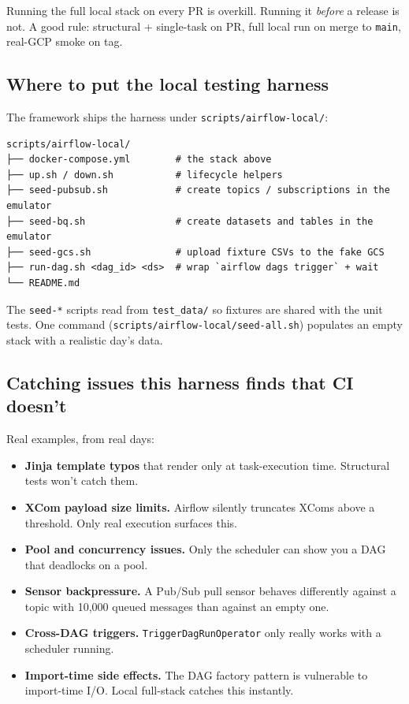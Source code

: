 \documentclass[
  11pt,
  british,
  oneside]{book}
\providecommand{\tightlist}{%
  \setlength{\itemsep}{0pt}\setlength{\parskip}{0pt}}
\begin{document}
Running the full local stack on every PR is overkill. Running it
\emph{before} a release is not. A good rule: structural + single-task on
PR, full local run on merge to \texttt{main}, real-GCP smoke on tag.

\hypertarget{where-to-put-the-local-testing-harness}{%
\subsection{Where to put the local testing
harness}\label{where-to-put-the-local-testing-harness}}

The framework ships the harness under \texttt{scripts/airflow-local/}:

\begin{verbatim}
scripts/airflow-local/
├── docker-compose.yml        # the stack above
├── up.sh / down.sh           # lifecycle helpers
├── seed-pubsub.sh            # create topics / subscriptions in the emulator
├── seed-bq.sh                # create datasets and tables in the emulator
├── seed-gcs.sh               # upload fixture CSVs to the fake GCS
├── run-dag.sh <dag_id> <ds>  # wrap `airflow dags trigger` + wait
└── README.md
\end{verbatim}

The \texttt{seed-*} scripts read from \texttt{test\_data/} so fixtures
are shared with the unit tests. One command
(\texttt{scripts/airflow-local/seed-all.sh}) populates an empty stack
with a realistic day's data.

\hypertarget{catching-issues-this-harness-finds-that-ci-doesnt}{%
\subsection{Catching issues this harness finds that CI
doesn't}\label{catching-issues-this-harness-finds-that-ci-doesnt}}

Real examples, from real days:

\begin{itemize}
\tightlist
\item
  \textbf{Jinja template typos} that render only at task-execution time.
  Structural tests won't catch them.
\item
  \textbf{XCom payload size limits.} Airflow silently truncates XComs
  above a threshold. Only real execution surfaces this.
\item
  \textbf{Pool and concurrency issues.} Only the scheduler can show you
  a DAG that deadlocks on a pool.
\item
  \textbf{Sensor backpressure.} A Pub/Sub pull sensor behaves
  differently against a topic with 10,000 queued messages than against
  an empty one.
\item
  \textbf{Cross-DAG triggers.} \texttt{TriggerDagRunOperator} only
  really works with a scheduler running.
\item
  \textbf{Import-time side effects.} The DAG factory pattern is
  vulnerable to import-time I/O. Local full-stack catches this
  instantly.
\end{itemize}
\end{document}
